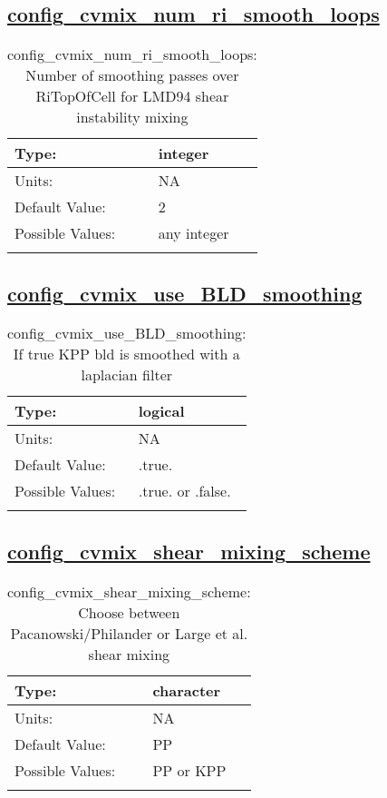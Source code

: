 \subsection[config\_cvmix\_num\_ri\_smooth\_loops]{\hyperref[sec:nm_tab_cvmix]{config\_cvmix\_num\_ri\_smooth\_loops}}
\label{subsec:nm_sec_config_cvmix_num_ri_smooth_loops}
\begin{center}
\begin{longtable}{| p{2.0in} || p{4.0in} |}
    \hline
    Type: & integer \\
    \hline
    Units: & \si{NA} \\
    \hline
    Default Value: & 2 \\
    \hline
    Possible Values: & any integer \\
    \hline
    \caption{config\_cvmix\_num\_ri\_smooth\_loops: Number of smoothing passes over RiTopOfCell for LMD94 shear instability mixing}
\end{longtable}
\end{center}
\subsection[config\_cvmix\_use\_BLD\_smoothing]{\hyperref[sec:nm_tab_cvmix]{config\_cvmix\_use\_BLD\_smoothing}}
\label{subsec:nm_sec_config_cvmix_use_BLD_smoothing}
\begin{center}
\begin{longtable}{| p{2.0in} || p{4.0in} |}
    \hline
    Type: & logical \\
    \hline
    Units: & \si{NA} \\
    \hline
    Default Value: & .true. \\
    \hline
    Possible Values: & .true. or .false. \\
    \hline
    \caption{config\_cvmix\_use\_BLD\_smoothing: If true KPP bld is smoothed with a laplacian filter}
\end{longtable}
\end{center}
\subsection[config\_cvmix\_shear\_mixing\_scheme]{\hyperref[sec:nm_tab_cvmix]{config\_cvmix\_shear\_mixing\_scheme}}
\label{subsec:nm_sec_config_cvmix_shear_mixing_scheme}
\begin{center}
\begin{longtable}{| p{2.0in} || p{4.0in} |}
    \hline
    Type: & character \\
    \hline
    Units: & \si{NA} \\
    \hline
    Default Value: & PP \\
    \hline
    Possible Values: & PP or KPP \\
    \hline
    \caption{config\_cvmix\_shear\_mixing\_scheme: Choose between Pacanowski/Philander or Large et al. shear mixing}
\end{longtable}
\end{center}
